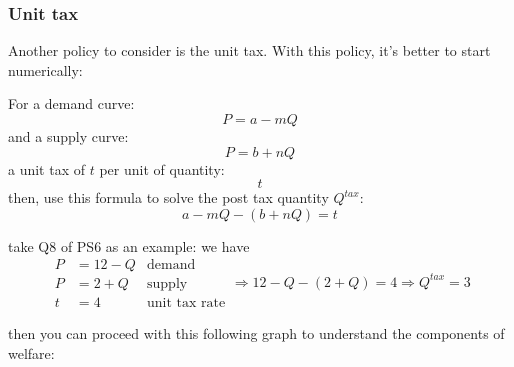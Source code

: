 \documentclass[twoside]{article}
\theoremstyle{definition}
\begin{document}
\subsubsection*{Unit tax}

Another policy to consider is the unit tax. With this policy, it's better to start numerically:

For a demand curve:
$$
P = a-mQ
$$
and a supply curve:
$$
P = b+nQ
$$
a unit tax of $t$ per unit of quantity:
$$
t
$$
then, use this formula to solve the post tax quantity $Q^{tax}$:
$$
a-mQ - (b+nQ) = t
$$

take Q8 of PS6 as an example: we have
$$\begin{aligned}
    P&= 12-Q & \text{demand}\\
    P&= 2+Q & \text{supply}\\
    t& =4 & \text{unit tax rate}
\end{aligned} \Rightarrow 12-Q-(2+Q)=4\Rightarrow Q^{tax}=3
$$

then you can proceed with this following graph to understand the components of welfare:
\end{document}
